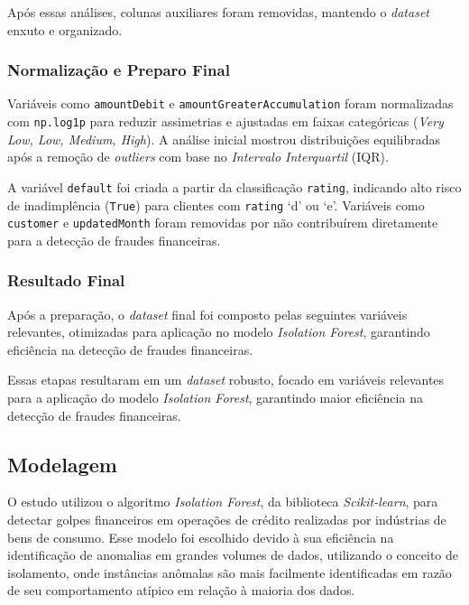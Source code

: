 \documentclass[12pt,a4paper]{article}
\begin{document}
Após essas análises, colunas auxiliares foram removidas, mantendo o \textit{dataset} enxuto e organizado.

\subsubsection{Normalização e Preparo Final}

Variáveis como \texttt{amountDebit} e \texttt{amountGreaterAccumulation} foram normalizadas com \texttt{np.log1p} para reduzir assimetrias e ajustadas em faixas categóricas (\textit{Very Low, Low, Medium, High}). A análise inicial mostrou distribuições equilibradas após a remoção de \textit{outliers} com base no \textit{Intervalo Interquartil} (IQR).

A variável \texttt{default} foi criada a partir da classificação \texttt{rating}, indicando alto risco de inadimplência (\texttt{True}) para clientes com \texttt{rating} `d' ou `e'. Variáveis como \texttt{customer} e \texttt{updatedMonth} foram removidas por não contribuírem diretamente para a detecção de fraudes financeiras.

\subsubsection{Resultado Final}

Após a preparação, o \textit{dataset} final foi composto pelas seguintes variáveis relevantes, otimizadas para aplicação no modelo \textit{Isolation Forest}, garantindo eficiência na detecção de fraudes financeiras.


Essas etapas resultaram em um \textit{dataset} robusto, focado em variáveis relevantes para a aplicação do modelo \textit{Isolation Forest}, garantindo maior eficiência na detecção de fraudes financeiras.


\subsection{Modelagem}

O estudo utilizou o algoritmo \textit{Isolation Forest}, da biblioteca \textit{Scikit-learn}, para detectar golpes financeiros em operações de crédito realizadas por indústrias de bens de consumo. Esse modelo foi escolhido devido à sua eficiência na identificação de anomalias em grandes volumes de dados, utilizando o conceito de isolamento, onde instâncias anômalas são mais facilmente identificadas em razão de seu comportamento atípico em relação à maioria dos dados.
\end{document}
